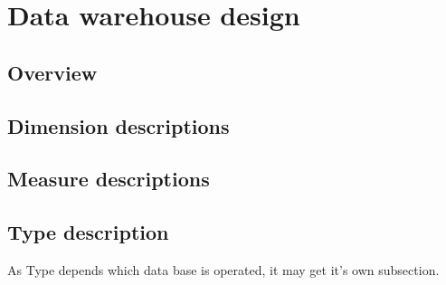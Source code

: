 \section{Data warehouse design}

\subsection{Overview}

\subsection{Dimension descriptions}

\subsection{Measure descriptions}

\subsection{Type description}
As Type depends which data base is operated, it may get it's own subsection.


